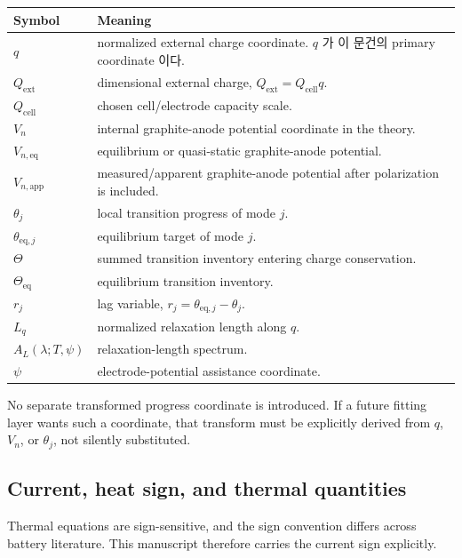\documentclass[11pt,a4paper]{article}
\newcommand{\eqs}{\mathrm{eq}}
\newcommand{\app}{\mathrm{app}}
\newcommand{\cell}{\mathrm{cell}}
\newcommand{\ext}{\mathrm{ext}}
\begin{document}
\begin{longtable}{@{}p{}p{}@{}}
\toprule
Symbol & Meaning \\
\midrule
\endhead
\(q\) & normalized external charge coordinate. \(q\) 가 이 문건의 primary coordinate 이다. \\
\(Q_{\ext}\) & dimensional external charge, \(Q_{\ext}=Q_{\cell}q\). \\
\(Q_{\cell}\) & chosen cell/electrode capacity scale. \\
\(V_n\) & internal graphite-anode potential coordinate in the theory. \\
\(V_{n,\eqs}\) & equilibrium or quasi-static graphite-anode potential. \\
\(V_{n,\app}\) & measured/apparent graphite-anode potential after polarization is included. \\
\(\theta_j\) & local transition progress of mode \(j\). \\
\(\theta_{\eqs,j}\) & equilibrium target of mode \(j\). \\
\(\Theta\) & summed transition inventory entering charge conservation. \\
\(\Theta_{\eqs}\) & equilibrium transition inventory. \\
\(r_j\) & lag variable, \(r_j=\theta_{\eqs,j}-\theta_j\). \\
\(L_q\) & normalized relaxation length along \(q\). \\
\(A_L(\lambda;T,\psi)\) & relaxation-length spectrum. \\
\(\psi\) & electrode-potential assistance coordinate. \\
\bottomrule
\end{longtable}

No separate transformed progress coordinate is introduced. If a future fitting layer wants such a coordinate,
that transform must be explicitly derived from \(q\), \(V_n\), or \(\theta_j\), not silently substituted.

\subsection{Current, heat sign, and thermal quantities}\label{sec:signs}

Thermal equations are sign-sensitive, and the sign convention differs across battery literature.
This manuscript therefore carries the current sign explicitly.
\end{document}
